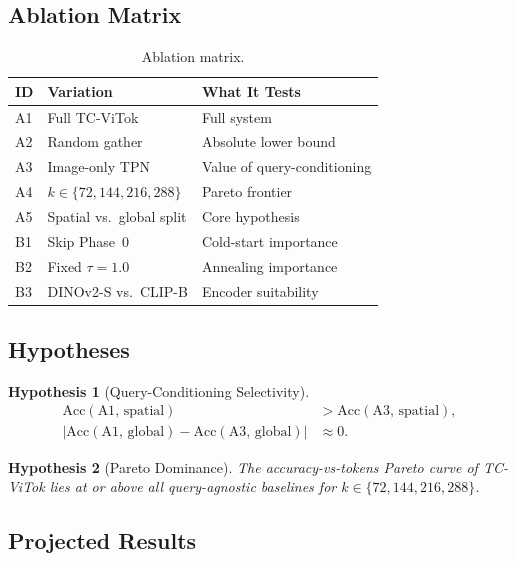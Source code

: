 \documentclass[11pt,a4paper]{article}
\newtheorem{hypothesis}{Hypothesis}
\begin{document}
\subsection{Ablation Matrix}

\begin{table}[h]
\centering
\caption{Ablation matrix.}
\label{tab:ablations}
\renewcommand{\arraystretch}{1.15}
\small
\begin{tabular}{@{}llp{5.5cm}@{}}
  \toprule
  ID & Variation & What It Tests \\
  \midrule
  A1 & Full TC-ViTok           & Full system \\
  A2 & Random gather            & Absolute lower bound \\
  A3 & Image-only TPN           & Value of query-conditioning \\
  A4 & $k\in\{72,144,216,288\}$ & Pareto frontier \\
  A5 & Spatial vs.\ global split & Core hypothesis \\
  \midrule
  B1 & Skip Phase~0             & Cold-start importance \\
  B2 & Fixed $\tau{=}1.0$       & Annealing importance \\
  B3 & DINOv2-S vs.\ CLIP-B     & Encoder suitability \\
  \bottomrule
\end{tabular}
\end{table}

\subsection{Hypotheses}

\begin{hypothesis}[Query-Conditioning Selectivity]
  \begin{align}
    \text{Acc}(\text{A1},\,\text{spatial})
      &> \text{Acc}(\text{A3},\,\text{spatial}), \\
    |\text{Acc}(\text{A1},\,\text{global})
      - \text{Acc}(\text{A3},\,\text{global})|
      &\approx 0.
  \end{align}
\end{hypothesis}

\begin{hypothesis}[Pareto Dominance]
The accuracy-vs-tokens Pareto curve of TC-ViTok lies at or above all
query-agnostic baselines for $k \in \{72, 144, 216, 288\}$.
\end{hypothesis}

\subsection{Projected Results}
\end{document}
